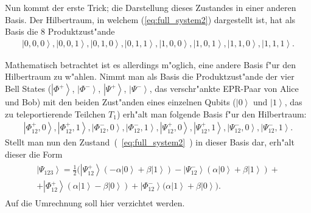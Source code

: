\begin{refsection}
Nun kommt der erste Trick; die Darstellung dieses Zustandes in einer anderen Basis. Der Hilbertraum, in welchem (\ref{eq:full_system2}) dargestellt ist, hat als Basis die 8 Produktzust"ande
\begin{align}
\left|  0,0,0 \right \rangle,\left|  0,0,1 \right \rangle,\left|  0,1,0 \right \rangle,\left|  0,1,1 \right \rangle,\left|  1,0,0 \right \rangle,\left|  1,0,1 \right \rangle,\left|  1,1,0 \right \rangle,\left|  1,1,1 \right \rangle.
\end{align}

Mathematisch betrachtet ist es allerdings m"oglich, eine andere Basis f"ur den Hilbertraum zu w"ahlen. Nimmt man als Basis die Produktzust"ande der vier Bell States ($\left|\Phi^+\right\rangle$, $\left|\Phi^-\right\rangle$, $\left|\Psi^+\right\rangle$, $\left|\Psi^-\right\rangle$, das verschr"ankte EPR-Paar von Alice und Bob) mit den beiden Zust"anden eines einzelnen Qubits ($\left|0\right\rangle$ und $\left|1\right\rangle$, das zu teleportierende Teilchen $T_{1}$) erh"alt man folgende Basis f"ur den Hilbertraum:
\begin{align}
\left|\Phi^{+}_{12},0\right\rangle,
\left|\Phi^{+}_{12},1\right\rangle, 
\left|\Phi^{-}_{12},0\right\rangle,
\left|\Phi^{-}_{12},1\right\rangle,
\left|\Psi^{+}_{12},0\right\rangle,
\left|\Psi^{+}_{12},1\right\rangle,
\left|\Psi^{-}_{12},0\right\rangle,
\left|\Psi^{-}_{12},1\right\rangle.
\end{align}
Stellt man nun den Zustand~(~\ref{eq:full_system2}~) in dieser Basis dar, erh"alt dieser die Form
\begin{align}\label{eq:full_system3}
	\begin{split}
\left| \Psi_{123} \right\rangle = \frac{1}{2} \Bigg( \left| \Psi_{12}^{+} \right\rangle (-\alpha \left| 0 \right\rangle + \beta \left| 1 \right\rangle) - \left| \Psi_{12}^{-} \right\rangle (\alpha \left| 0 \right\rangle + \beta \left| 1 \right\rangle ) +
\\
+ \left| \Phi_{12}^{+} \right\rangle (\alpha \left| 1 \right\rangle - \beta \left| 0 \right\rangle) + \left| \Phi_{12}^{-} \right\rangle (\alpha \left| 1 \right\rangle + \beta \left| 0 \right\rangle
 \Bigg).
 \end{split}
\end{align}
Auf die Umrechnung soll hier verzichtet werden.


\end{refsection}

